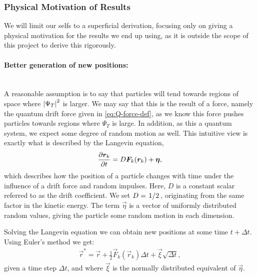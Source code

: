 \documentclass[twocolumn]{article}
\begin{document}
\subsubsection{Physical Motivation of Results}
We will limit our selfs to a superficial derivation, focusing only on giving a
physical motivation for the results we end up using, as it is outside the scope
of this project to derive this rigorously.

\paragraph{Better generation of new positions:}$\,$\\
A reasonable assumption is to say that particles will tend towards regions of
space where $\abs{\Psi_T}^2$ is larger. We may say that this is the result of a
force, namely the quantum drift force given in \eqref{eq:Q-force-def}, as we
know this force pushes particles towards regions where $\Psi_T$ is large. In
addition, as this a quantum system, we expect some degree of random motion as
well. This intuitive view is exactly what is described by
the Langevin equation,
\begin{align}
    \pdv{\bm r_k}{t} = D\bm F_k(\bm r_k) + \bm\eta,\label{eq:Langevin}
\end{align}
which describes how the position of a particle changes with time under the
influence of a drift force and random impulses. Here, $D$ is
a constant scalar referred to as the drift coefficient. We set
$D=\flatfrac{1}{2}$, originating from the same factor in the kinetic energy. The
term $\vec\eta$ is a vector of
uniformly distributed random values, giving the particle some random motion in each
dimension.

Solving the Langevin equation we can obtain new positions at some time
$t+\Delta t$. Using Euler's method we get:
\begin{align}
    \vec r^* = \vec r + \frac{1}{2}\vec F_k(\vec r_k)\Delta t + \vec \xi\sqrt{\Delta
    t}\label{eq:Langevin-solution},
\end{align}
given a time step $\Delta t$, and where $\vec \xi$ is the normally distributed
equivalent of $\vec \eta$. 
\end{document}
